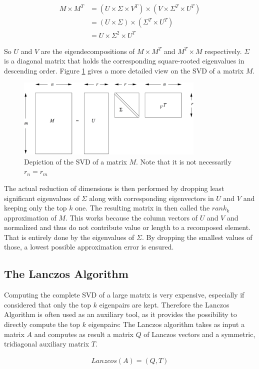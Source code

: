 \begin{align*}
	M \times M^T 	& = (U \times \Sigma \times V^T) \times (V \times \Sigma^T \times U^T) \\
					& = (U \times \Sigma) \times (\Sigma^T \times U^T) \\
					& = U \times \Sigma^2 \times U^T
\end{align*}

So $U$ and $V$ are the eigendecompositions of $M\times M^T$ and $M^T\times M$ respectively. $\Sigma$ is a diagonal matrix that holds the corresponding square-rooted eigenvalues in descending order. Figure \ref{fig:svd} gives a more detailed view on the SVD of a matrix $M$. 

\begin{figure}[h]
	\centering
	\includegraphics[width=0.8\textwidth]{images/svd_mmds.png}
	\caption{Depiction of the SVD of a matrix $M$. Note that it is not necessarily $r_n = r_m$}
	\label{fig:svd}
\end{figure}

The actual reduction of dimensions is then performed by dropping least significant eigenvalues of $\Sigma$ along with corresponding eigenvectors in $U$ and $V$ and keeping only the top $k$ one. The resulting matrix in then called the $rank_k$ approximation of $M$. This works because the column vectors of $U$ and $V$ and normalized and thus do not contribute value or length to a recomposed element. That is entirely done by the eigenvalues of $\Sigma$. By dropping the smallest values of those, a lowest possible approximation error is ensured.

\subsection{The Lanczos Algorithm}

Computing the complete SVD of a large matrix is very expensive, especially if considered that only the top $k$ eigenpairs are kept. Therefore the Lanczos Algorithm is often used as an auxiliary tool, as it provides the possibility to directly compute the top $k$ eigenpairs: The Lanczos algorithm takes as input a matrix $A$ and computes as result a matrix $Q$ of Lanczos vectors and a symmetric, tridiagonal auxiliary matrix $T$.

\begin{align*}
	Lanzcos(A) = (Q,T)
\end{align*}



